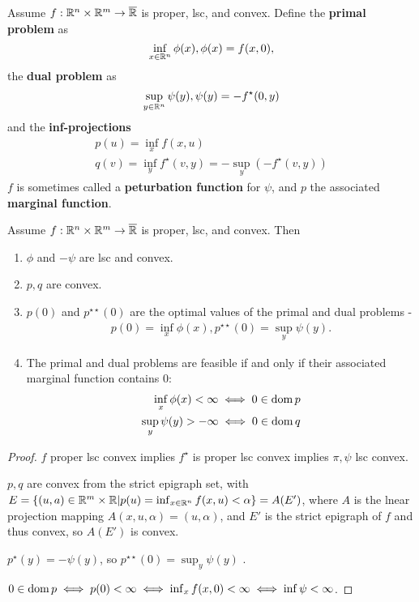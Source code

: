 \begin{defn}
  \label{sec:duality-optimization-1}
  Assume $f: \mathbb{R}^{n} \times \mathbb{R}^{m} \rightarrow \overline {\mathbb{R}}$ is proper,
  lsc, and convex.  Define the \textbf{primal problem} as
  \begin{equation}
    \label{eq:33}
    \inf_{x \in \mathbb{R}^{n}} \phi(x), \phi(x) = f(x, 0),
  \end{equation} the \textbf{dual problem} as
  \begin{equation}
    \label{eq:34}
    \sup_{y \in \mathbb{R}^{n}} \psi(y), \psi(y) = -f^{\star}(0, y)
  \end{equation}
  and the \textbf{inf-projections}
  \begin{align}
    \label{eq:35}
    p(u) = \inf_{x} f(x, u) \\
    \label{eq:36}
    q(v) = \inf_{y} f^{\star}(v, y) = -\sup_{y} (-f^{\star}(v, y))
  \end{align}
  $f$ is sometimes called a \textbf{peturbation function} for $\psi$,
  and $p$ the associated \textbf{marginal function}.
\end{defn}

\begin{thm}
  \label{sec:duality-optimization-2}
  Assume $f: \mathbb{R}^{n} \times \mathbb{R}^{m} \rightarrow \overline {\mathbb{R}}$ is proper,
  lsc, and convex.  Then
  \begin{enumerate}
  \item $\phi$ and $-\psi$ are lsc and convex.
  \item $p, q$ are convex.
  \item $p(0)$ and $p^{\star \star}(0)$ are the optimal values of the
    primal and dual problems -
    \begin{align}
      \label{eq:37}
      p(0)  = \inf_{x} \phi(x), p^{\star \star}(0) = \sup_{y} \psi(y).
    \end{align}
  \item The primal and dual problems are feasible if and only if their
    associated marginal function contains 0:
    \begin{align}
      \label{eq:38}
      \inf_{x} \phi(x) < \infty \iff 0 \in \operatorname*{dom} p \\
      \label{eq:39}
      \sup_{y} \psi(y) > -\infty \iff 0 \in \operatorname*{dom} q
    \end{align}
  \end{enumerate}
\end{thm}

\begin{proof}
  $f$ proper lsc convex implies $f^{\star}$ is proper lsc convex
  implies $\pi, \psi$ lsc convex.

  $p, q$ are convex from the strict epigraph set, with $E = \{ (u, a)
  \in \mathbb{R}^{m } \times \mathbb{R} | p(u) = \inf_{x \in \mathbb{R}^{n}} f(x, u) < \alpha
  \} = A(E')$, where $A$ is the lnear projection mapping $A(x, u,
  \alpha) = (u, \alpha)$, and $E'$ is the strict epigraph of $f$ and
  thus convex, so $A(E')$ is convex.

  $p^{\star}(y) = -\psi(y)$, so $p^{\star \star}(0) = \sup_{y} \psi(y)$ .

  $0 \in \operatorname*{dom} p \iff p(0) < \infty \iff \inf_{x} f(x, 0) < \infty \iff
  \inf \psi < \infty$.
\end{proof}

